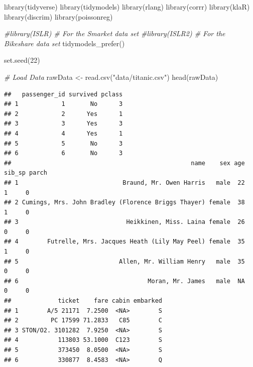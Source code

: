 \documentclass[
]{article}
\newenvironment{Shaded}{\begin{snugshade}}{\end{snugshade}}
\newcommand{\CommentTok}[1]{\textcolor[rgb]{0.56,0.35,0.01}{\textit{#1}}}
\newcommand{\DecValTok}[1]{\textcolor[rgb]{0.00,0.00,0.81}{#1}}
\newcommand{\FunctionTok}[1]{\textcolor[rgb]{0.00,0.00,0.00}{#1}}
\newcommand{\NormalTok}[1]{#1}
\newcommand{\OtherTok}[1]{\textcolor[rgb]{0.56,0.35,0.01}{#1}}
\newcommand{\StringTok}[1]{\textcolor[rgb]{0.31,0.60,0.02}{#1}}
\begin{document}
\begin{Shaded}
\begin{Highlighting}[]
\FunctionTok{library}\NormalTok{(tidyverse)}
\FunctionTok{library}\NormalTok{(tidymodels)}
\FunctionTok{library}\NormalTok{(rlang)}
\FunctionTok{library}\NormalTok{(corrr)}
\FunctionTok{library}\NormalTok{(klaR)}
\FunctionTok{library}\NormalTok{(discrim)}
\FunctionTok{library}\NormalTok{(poissonreg)}

\CommentTok{\#library(ISLR) \# For the Smarket data set}
\CommentTok{\#library(ISLR2) \# For the Bikeshare data set}
\FunctionTok{tidymodels\_prefer}\NormalTok{()}

\FunctionTok{set.seed}\NormalTok{(}\DecValTok{22}\NormalTok{)}

\CommentTok{\# Load Data}
\NormalTok{rawData }\OtherTok{\textless{}{-}} \FunctionTok{read.csv}\NormalTok{(}\StringTok{"data/titanic.csv"}\NormalTok{)}
\FunctionTok{head}\NormalTok{(rawData)}
\end{Highlighting}
\end{Shaded}

\begin{verbatim}
##   passenger_id survived pclass
## 1            1       No      3
## 2            2      Yes      1
## 3            3      Yes      3
## 4            4      Yes      1
## 5            5       No      3
## 6            6       No      3
##                                                  name    sex age sib_sp parch
## 1                             Braund, Mr. Owen Harris   male  22      1     0
## 2 Cumings, Mrs. John Bradley (Florence Briggs Thayer) female  38      1     0
## 3                              Heikkinen, Miss. Laina female  26      0     0
## 4        Futrelle, Mrs. Jacques Heath (Lily May Peel) female  35      1     0
## 5                            Allen, Mr. William Henry   male  35      0     0
## 6                                    Moran, Mr. James   male  NA      0     0
##             ticket    fare cabin embarked
## 1        A/5 21171  7.2500  <NA>        S
## 2         PC 17599 71.2833   C85        C
## 3 STON/O2. 3101282  7.9250  <NA>        S
## 4           113803 53.1000  C123        S
## 5           373450  8.0500  <NA>        S
## 6           330877  8.4583  <NA>        Q
\end{verbatim}
\end{document}
